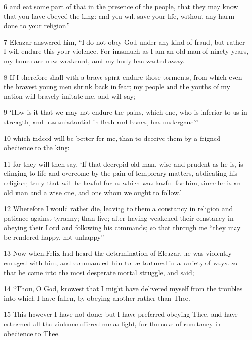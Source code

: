 \par 6 and eat some part of that in the presence of the people, that they may know that you have obeyed the king: and you will save your life, without any harm done to your religion.” 

\par 7 Eleazar answered him, “I do not obey God under any kind of fraud, but rather I will endure this your violence. For inasmuch as I am an old man of ninety years, my bones are now weakened, and my body has wasted away. 

\par 8 If I therefore shall with a brave spirit endure those torments, from which even the bravest young men shrink back in fear; my people and the youths of my nation will bravely imitate me, and will say; 

\par 9 ‘How is it that we may not endure the pains, which one, who is inferior to us in strength, and less substantial in flesh and bones, has undergone?’ 

\par 10 which indeed will be better for me, than to deceive them by a feigned obedience to the king: 

\par 11 for they will then say, ‘If that decrepid old man, wise and prudent as he is, is clinging to life and overcome by the pain of temporary matters, abdicating his religion; truly that will be lawful for us which was lawful for him, since he is an old man and a wise one, and one whom we ought to follow.’ 

\par 12 Wherefore I would rather die, leaving to them a constancy in religion and patience against tyranny; than live; after having weakened their constancy in obeying their Lord and following his commands; so that through me “they may be rendered happy, not unhappy.” 

\par 13 Now when.Felix had heard the determination of Eleazar, he was violently enraged with him, and commanded him to be tortured in a variety of ways: so that he came into the most desperate mortal struggle, and said; 

\par 14 “Thou, O God, knowest that I might have delivered myself from the troubles into which I have fallen, by obeying another rather than Thee. 

\par 15 This however I have not done; but I have preferred obeying Thee, and have esteemed all the violence offered me as light, for the sake of constaney in obedience to Thee. 

